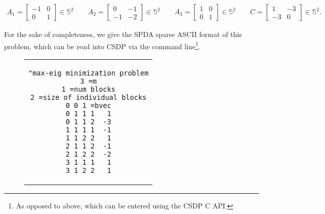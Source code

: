 \documentclass[a4paper]{article}
\begin{document}
\begin{align*}
A_1 = \begin{bmatrix}-1&0\\0&1\end{bmatrix}\in\mathbb{S}^2
\qquad
A_2 = \begin{bmatrix}0&-1\\-1&-2\end{bmatrix}\in\mathbb{S}^2
\qquad
A_3 = \begin{bmatrix}1&0\\0&1\end{bmatrix}\in\mathbb{S}^2
\qquad
C   = \begin{bmatrix}1&-3\\-3&0\end{bmatrix}\in\mathbb{S}^2.
\end{align*}

For the sake of completeness, we give the SPDA sparse ASCII format of this problem, which can be read into CSDP via the command line\footnote{As opposed to above, which can be entered using the CSDP C API.}.
\begin{figure}[b!]
\centering
\begin{tabular}{c}
\begin{lstlisting}[]
"max-eig minimization problem
3 =m
1 =num blocks
2 =size of individual blocks
0 0 1 =bvec
0 1 1 1   1
0 1 1 2  -3
1 1 1 1  -1
1 1 2 2   1
2 1 1 2  -1
2 1 2 2  -2
3 1 1 1   1
3 1 2 2   1
\end{lstlisting}
\end{tabular}
\end{figure}


\end{document}
